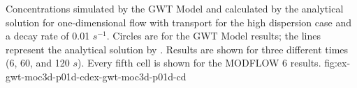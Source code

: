\begin{StandardFigure}{
                                     Concentrations simulated by the \mf GWT Model and calculated by the analytical solution for one-dimensional flow with transport for the high dispersion case and a decay rate of 0.01 $s^{-1}$.  Circles are for the GWT Model results; the lines represent the analytical solution by \cite{wexler1992}.  Results are shown for three different times (6, 60, and 120 $s$).  Every fifth cell is shown for the MODFLOW 6 results.
                                     }{fig:ex-gwt-moc3d-p01d-cd}{ex-gwt-moc3d-p01d-cd}
\end{StandardFigure}            

